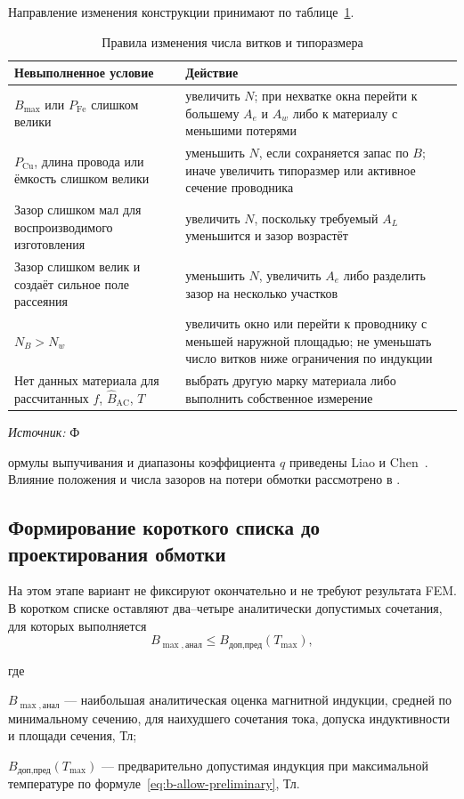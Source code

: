 \documentclass[14pt,a4paper]{extarticle}
\newcommand{\source}[1]{\par\noindent\textit{Источник:} #1\par}
\newenvironment{whereblock}
 {\par\noindent где\par
  \begin{list}{}{\setlength{\leftmargin}{12.5mm}
                  \setlength{\itemindent}{-12.5mm}
                  \setlength{\itemsep}{0pt}
                  \setlength{\parsep}{0pt}
                  \setlength{\topsep}{0pt}}}
 {\end{list}}
\newcommand{\whereitem}[2]{\item[] #1 --- #2}
\begin{document}
Направление изменения конструкции принимают по
таблице~\ref{tab:iteration-direction}.

\begin{table}[H]
\caption{Правила изменения числа витков и типоразмера}
\label{tab:iteration-direction}
\centering
\small
\begin{tabularx}{\textwidth}{>{\raggedright\arraybackslash}p{48mm} X}
\toprule
Невыполненное условие & Действие \\
\midrule
$B_{\max}$ или $P_{\text{Fe}}$ слишком велики &
увеличить $N$; при нехватке окна перейти к большему $A_e$ и $A_w$ либо к
материалу с меньшими потерями \\
$P_{\text{Cu}}$, длина провода или ёмкость слишком велики &
уменьшить $N$, если сохраняется запас по $B$; иначе увеличить типоразмер
или активное сечение проводника \\
Зазор слишком мал для воспроизводимого изготовления &
увеличить $N$, поскольку требуемый $A_L$ уменьшится и зазор возрастёт \\
Зазор слишком велик и создаёт сильное поле рассеяния &
уменьшить $N$, увеличить $A_e$ либо разделить зазор на несколько участков \\
$N_B>N_w$ &
увеличить окно или перейти к проводнику с меньшей наружной площадью; не
уменьшать число витков ниже ограничения по индукции \\
Нет данных материала для рассчитанных $f$, $\widehat B_{\text{AC}}$, $T$ &
выбрать другую марку материала либо выполнить собственное измерение \\
\bottomrule
\end{tabularx}
\end{table}

\source Формулы выпучивания и диапазоны коэффициента $q$ приведены Liao
и Chen~\cite{liao}. Влияние положения и числа зазоров на потери обмотки
рассмотрено в \cite{papamanolis,ewald_litz,meng}.

\subsection{Формирование короткого списка до проектирования обмотки}

На этом этапе вариант не фиксируют окончательно и не требуют результата
FEM. В коротком списке оставляют два--четыре аналитически допустимых
сочетания, для которых выполняется
\begin{equation}
 B_{\max,\text{анал}}
 \leq B_{\text{доп,пред}}\!\left(T_{\max}\right),
 \label{eq:b-acceptance}
\end{equation}
\begin{whereblock}
\whereitem{$B_{\max,\text{анал}}$}{наибольшая аналитическая оценка
магнитной индукции, средней по минимальному сечению, для наихудшего
сочетания тока, допуска индуктивности и площади сечения, Тл;}
\whereitem{$B_{\text{доп,пред}}(T_{\max})$}{предварительно допустимая
индукция при максимальной температуре по
формуле~\eqref{eq:b-allow-preliminary}, Тл.}
\end{whereblock}
\end{document}
